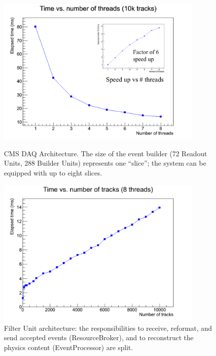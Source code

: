 \documentclass{JINST}
\begin{document}
\begin{figure}[!Hhtb]
\begin{minipage}[t]{8.0cm}
\begin{center}
	\includegraphics[width=0.9\textwidth]{figs/TimeVsThreads.pdf}
	\caption{CMS DAQ Architecture. The size  of the event builder (72 Readout
Units, 288  Builder Units) represents one “slice”; the  system can be equipped
with up to eight slices. \label{fig:hltarc}}
	\end{center}
\end{minipage}
\begin{minipage}[t]{8.0cm}
\begin{center}
	\includegraphics[width=0.9\textwidth]{figs/TimeVsTracks.pdf}
	\caption{Filter Unit architecture: the responsibilities to receive, reformat, and
send accepted events (ResourceBroker), and to reconstruct the physics content
(EventProcessor) are split.  \label{fig:fu}}
	\end{center}
\end{minipage}
\end{figure}
\end{document}
